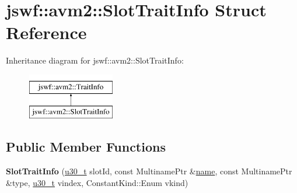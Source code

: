 \hypertarget{structjswf_1_1avm2_1_1_slot_trait_info}{\section{jswf\+:\+:avm2\+:\+:Slot\+Trait\+Info Struct Reference}
\label{structjswf_1_1avm2_1_1_slot_trait_info}
}
Inheritance diagram for jswf\+:\+:avm2\+:\+:Slot\+Trait\+Info\+:\begin{figure}[H]
\begin{center}
\leavevmode
\includegraphics[height=2.000000cm]{structjswf_1_1avm2_1_1_slot_trait_info}
\end{center}
\end{figure}
\subsection*{Public Member Functions}
\begin{DoxyCompactItemize}
\item 
\hypertarget{structjswf_1_1avm2_1_1_slot_trait_info_a9acea3312d077158cb3887a93627683b}{{\bfseries Slot\+Trait\+Info} (\hyperlink{namespacejswf_aa10d9ddca2a6a5debdc261dfae3d1117}{u30\+\_\+t} slot\+Id, const Multiname\+Ptr \&\hyperlink{structjswf_1_1avm2_1_1_trait_info_a4c2e1b9f0cf031e27b60fe4a0febbd59}{name}, const Multiname\+Ptr \&type, \hyperlink{namespacejswf_aa10d9ddca2a6a5debdc261dfae3d1117}{u30\+\_\+t} vindex, Constant\+Kind\+::\+Enum vkind)}\label{structjswf_1_1avm2_1_1_slot_trait_info_a9acea3312d077158cb3887a93627683b}

\end{DoxyCompactItemize}
